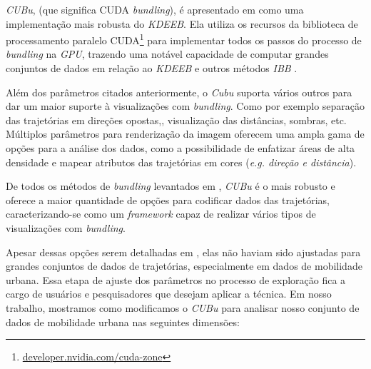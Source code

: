 \emph{CUBu}, (que significa CUDA \emph{bundling}), é apresentado em
\citet{zwan:16} como uma implementação mais robusta do \emph{KDEEB}. Ela
utiliza os recursos da biblioteca de processamento paralelo
CUDA\footnote{\url{developer.nvidia.com/cuda-zone}} para implementar todos os
passos do processo de \emph{bundling} na \emph{GPU}, trazendo uma notável
capacidade de computar grandes conjuntos de dados em relação ao \emph{KDEEB}
e outros métodos \emph{IBB} \citep{adeb,lhuillier-fft:17}.

Além dos parâmetros citados anteriormente, o \emph{Cubu} suporta vários
outros para dar um maior suporte à visualizações com \emph{bundling}. Como por
exemplo separação das trajetórias em direções opostas,\cite{adeb}, visualização
das distâncias, sombras, etc. Múltiplos parâmetros para renderização da imagem oferecem
uma ampla gama de opções para a análise dos dados, como a possibilidade de
enfatizar áreas de alta densidade e mapear atributos das trajetórias
em cores (\emph{e.g. direção e distância}).
 
De todos os métodos de \emph{bundling} levantados em \citet{Lhuillier2017},
\emph{CUBu} é o mais robusto e oferece a maior quantidade de opções para codificar
dados das trajetórias, caracterizando-se como um \emph{framework} capaz de realizar
vários tipos de visualizações com \emph{bundling}.

Apesar dessas opções serem detalhadas em \citet{zwan:16}, elas não haviam sido
ajustadas para grandes conjuntos de dados de trajetórias, especialmente em dados
de mobilidade urbana. Essa etapa de ajuste dos parâmetros no processo de
exploração fica a cargo de usuários e pesquisadores que desejam aplicar a
técnica. Em nosso trabalho, mostramos como modificamos o \emph{CUBu} para
analisar nosso conjunto de dados de mobilidade urbana nas seguintes dimensões:

